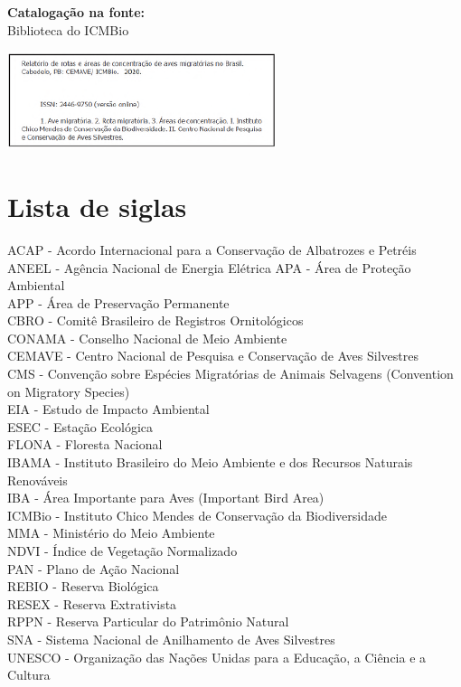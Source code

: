 \documentclass[
  oneside]{scrbook}
\begin{document}
\textbf{Catalogação na fonte:}\\
Biblioteca do ICMBio

\begin{center}\includegraphics[width=0.75\linewidth]{imagens/ficha} \end{center}

\hypertarget{lista-siglas}{%
\chapter*{Lista de siglas}\label{lista-siglas}}

ACAP - Acordo Internacional para a Conservação de Albatrozes e Petréis\\
ANEEL - Agência Nacional de Energia Elétrica APA - Área de Proteção Ambiental\\
APP - Área de Preservação Permanente\\
CBRO - Comitê Brasileiro de Registros Ornitológicos\\
CONAMA - Conselho Nacional de Meio Ambiente\\
CEMAVE - Centro Nacional de Pesquisa e Conservação de Aves Silvestres\\
CMS - Convenção sobre Espécies Migratórias de Animais Selvagens (Convention on Migratory Species)\\
EIA - Estudo de Impacto Ambiental\\
ESEC - Estação Ecológica\\
FLONA - Floresta Nacional\\
IBAMA - Instituto Brasileiro do Meio Ambiente e dos Recursos Naturais Renováveis\\
IBA - Área Importante para Aves (Important Bird Area)\\
ICMBio - Instituto Chico Mendes de Conservação da Biodiversidade\\
MMA - Ministério do Meio Ambiente\\
NDVI - Índice de Vegetação Normalizado\\
PAN - Plano de Ação Nacional\\
REBIO - Reserva Biológica\\
RESEX - Reserva Extrativista\\
RPPN - Reserva Particular do Patrimônio Natural\\
SNA - Sistema Nacional de Anilhamento de Aves Silvestres\\
UNESCO - Organização das Nações Unidas para a Educação, a Ciência e a Cultura
\end{document}
